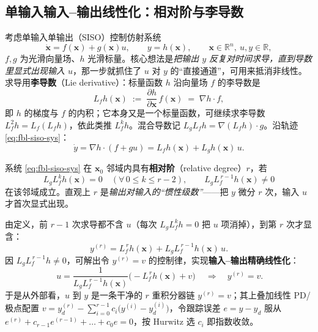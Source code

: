 \subsection{单输入输入–输出线性化：相对阶与李导数}
\label{sec:fbl-siso}

考虑单输入单输出（SISO）控制仿射系统
\begin{equation}
  \dot{\mathbf{x}}=f(\mathbf{x})+g(\mathbf{x})u,\qquad y=h(\mathbf{x}),\qquad \mathbf{x}\in\mathbb{R}^n,\ u,y\in\mathbb{R},
  \label{eq:fbl-siso-sys}
\end{equation}
$f,g$ 为光滑向量场、$h$ 光滑标量。核心想法是\emph{把输出 $y$ 反复对时间求导，直到导数里显式出现输入 $u$}，那一步就抓住了 $u$ 对 $y$ 的“直接通道”，可用来抵消非线性。求导用\textbf{李导数}（Lie derivative）：标量函数 $h$ 沿向量场 $f$ 的李导数是
\begin{equation}
  L_f h(\mathbf{x})\;:=\;\frac{\partial h}{\partial \mathbf{x}}\,f(\mathbf{x})\;=\;\nabla h\cdot f,
  \label{eq:fbl-liederiv}
\end{equation}
即 $h$ 的梯度与 $f$ 的内积；它本身又是一个标量函数，可继续求李导数 $L_f^2 h=L_f(L_f h)$，依此类推 $L_f^k h$。混合导数记 $L_g L_f h=\nabla(L_f h)\cdot g$。沿轨迹 \cref{eq:fbl-siso-sys}：
\begin{equation}
  \dot y=\nabla h\cdot(f+gu)=L_f h(\mathbf{x})+L_g h(\mathbf{x})\,u.
  \label{eq:fbl-ydot}
\end{equation}

\begin{definition}[相对阶]
\label{def:fbl-relative-degree}
系统 \cref{eq:fbl-siso-sys} 在 $\mathbf{x}_0$ 邻域内具有\textbf{相对阶}（relative degree）$r$，若
\begin{equation}
  L_g L_f^{k} h(\mathbf{x})=0\quad(\forall\,0\le k\le r-2),\qquad L_g L_f^{\,r-1} h(\mathbf{x})\neq 0
  \label{eq:fbl-reldeg}
\end{equation}
在该邻域成立。直观上 $r$ 是\emph{输出对输入的“惯性级数”}——把 $y$ 微分 $r$ 次，输入 $u$ 才首次显式出现。
\end{definition}

由定义，前 $r-1$ 次求导都不含 $u$（每次 $L_g L_f^k h=0$ 把 $u$ 项消掉），到第 $r$ 次才显含：
\begin{equation}
  y^{(r)}=L_f^{\,r} h(\mathbf{x})+L_g L_f^{\,r-1} h(\mathbf{x})\,u .
  \label{eq:fbl-yr}
\end{equation}
因 $L_g L_f^{\,r-1}h\neq0$，可解出令 $y^{(r)}=v$ 的控制律，实现\textbf{输入–输出精确线性化}：
\begin{equation}
  \boxed{\,u=\frac{1}{L_g L_f^{\,r-1} h(\mathbf{x})}\Big(-L_f^{\,r} h(\mathbf{x})+v\Big)\,}\quad\Longrightarrow\quad y^{(r)}=v.
  \label{eq:fbl-siso-law}
\end{equation}
于是从外部看，$u$ 到 $y$ 是一条干净的 $r$ 重积分器链 $y^{(r)}=v$；其上叠加线性 PD/极点配置 $v=y_d^{(r)}-\sum_{i=0}^{r-1}c_i\big(y^{(i)}-y_d^{(i)}\big)$，令跟踪误差 $e=y-y_d$ 服从 $e^{(r)}+c_{r-1}e^{(r-1)}+\dots+c_0 e=0$，按 Hurwitz 选 $c_i$ 即指数收敛。

